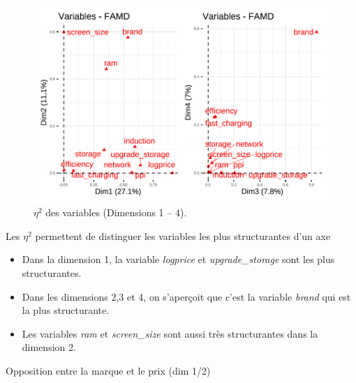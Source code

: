 \documentclass[
  12pt,
]{report}
\begin{document}
\begin{figure}[H]

{\centering \includegraphics{report_files/figure-pdf/unnamed-chunk-16-1.pdf}

}

\caption{\(\eta^2\) des variables (Dimensions 1 -- 4).}

\end{figure}%

Les \(\eta^2\) permettent de distinguer les variables les plus
structurantes d'un axe

\begin{itemize}
\item
  Dans la dimension 1, la variable \emph{logprice} et
  \emph{upgrade\_storage} sont les plus structurantes.
\item
  Dans les dimensions 2,3 et 4, on s'aperçoit que c'est la variable
  \emph{brand} qui est la plus structurante.
\item
  Les variables \emph{ram} et \emph{screen\_size} sont aussi très
  structurantes dans la dimension 2.
\end{itemize}

Opposition entre la marque et le prix (dim 1/2)
\end{document}
